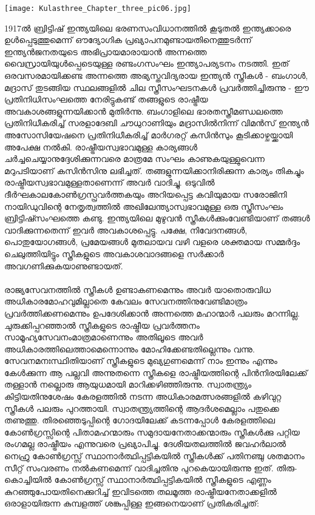 \label{ch3box2} %
\begin{tcolorbox}[%
 breakable, %
  arc=0mm, 
  left=1pt, right = 1pt, 
  boxrule=0mm,
  colback = {blue!10}, %
] 

\begin{center}
\texttt{[image: Kulasthree\_Chapter\_three\_pic06.jpg]}
\end{center}


1917ൽ ബ്രിട്ടിഷ് ഇന്ത്യയിലെ ഭരണസംവിധാനത്തിൽ കൂടുതൽ ഇന്ത്യക്കാരെ ഉൾപ്പെടുത്തുമെന്ന് ഔദ്യോഗിക പ്രഖ്യാപനമുണ്ടായതിനെത്തുടർന്ന് ഇന്ത്യൻജനതയുടെ അഭിപ്രായമാരായാൻ അന്നത്തെ വൈസ്രായിയുൾപ്പെടെയുള്ള രണ്ടംഗസംഘം ഇന്ത്യാപര്യടനം നടത്തി. ഇത് ഒരവസരമായിക്കണ്ട അന്നത്തെ അഭ്യസ്തവിദ്യരായ ഇന്ത്യൻ സ്ത്രീകൾ - ബംഗാൾ, മദ്രാസ് തുടങ്ങിയ സ്ഥലങ്ങളിൽ ചില സ്ത്രീസംഘടനകൾ പ്രവർത്തിച്ചിരുന്നു - ഈ പ്രതിനിധിസംഘത്തെ നേരിട്ടുകണ്ട് തങ്ങളുടെ രാഷ്ട്രീയ അവകാശങ്ങളുന്നയിക്കാൻ മുതിർന്നു. ബംഗാളിലെ ഭാരതസ്ത്രീമണ്ഡലത്തെ പ്രതിനിധീകരിച്ച് സരളാദേബി ചൗധുറാണിയും മദ്രാസിൽനിന്ന് വിമൻസ് ഇന്ത്യൻ അസോസിയേഷനെ പ്രതിനിധീകരിച്ച് മാർഗരറ്റ് കസിൻസും കൂടിക്കാഴ്ചയ്ക്കായി അപേക്ഷ നൽകി. രാഷ്ട്രീയസ്വഭാവമുള്ള കാര്യങ്ങൾ ചർച്ചചെയ്യാനുദ്ദേശിക്കുന്നവരെ മാത്രമേ സംഘം കാണുകയുള്ളുവെന്ന മറുപടിയാണ് കസിൻസിനു ലഭിച്ചത്. തങ്ങളുന്നയിക്കാനിരിക്കുന്ന കാര്യം തികച്ചും രാഷ്ട്രീയസ്വഭാവമുള്ളതാണെന്ന് അവർ വാദിച്ചു. ഒടുവിൽ ദീർഘകാലകോൺഗ്രസ്പ്രവർത്തകയും അറിയപ്പെട്ട കവിയുമായ സരോജിനി നായിഡുവിന്റെ നേതൃത്വത്തിൽ അഖിലേന്ത്യാസ്വഭാവമുള്ള ഒരു സ്ത്രീസംഘം ബ്രിട്ടിഷ്സംഘത്തെ കണ്ടു. ഇന്ത്യയിലെ മുഴുവൻ സ്ത്രീകൾക്കുംവേണ്ടിയാണ് തങ്ങൾ വാദിക്കുന്നതെന്ന് ഇവർ അവകാശപ്പെട്ടു. പക്ഷേ, നിവേദനങ്ങൾ, പൊതുയോഗങ്ങൾ, പ്രമേയങ്ങൾ മുതലായവ വഴി വളരെ ശക്തമായ സമ്മർദ്ദം ചെലുത്തിയിട്ടും സ്ത്രീകളുടെ അവകാശവാദങ്ങളെ സർക്കാർ അവഗണിക്കുകയാണുണ്ടായത്.

\end{tcolorbox}

\paragraph{}

രാജ്യസേവനത്തിൽ സ്ത്രീകൾ ഉണ്ടാകണമെന്നും അവർ യാതൊരുവിധ അധികാരമോഹവുമില്ലാതെ കേവലം സേവനത്തിനുവേണ്ടിമാത്രം പ്രവർത്തിക്കണമെന്നും ഉപദേശിക്കാൻ അന്നത്തെ മഹാന്മാർ പലരും മറന്നില്ല. ചുരുക്കിപ്പറഞ്ഞാൽ സ്ത്രീകളുടെ രാഷ്ട്രീയ പ്രവർത്തനം സാമൂഹ്യസേവനംമാത്രമാണെന്നും അതിലൂടെ അവർ അധികാരത്തിലെത്താമെന്നൊന്നും മോഹിക്കേണ്ടതില്ലെന്നും വന്നു. സേവനമനഃസ്ഥിതിയാണ് സ്ത്രീകളുടെ മുഖ്യഗുണമെന്ന് നാം ഇന്നും എന്നും കേൾക്കുന്ന ആ പല്ലവി അന്നുതന്നെ സ്ത്രീകളെ രാഷ്ട്രീയത്തിന്റെ പിൻനിരയിലേക്ക് തള്ളാൻ നല്ലൊരു ആയുധമായി മാറിക്കഴിഞ്ഞിരുന്നു. സ്വാതന്ത്ര്യം കിട്ടിയതിനുശേഷം കേരളത്തിൽ നടന്ന അധികാരമത്സരങ്ങളിൽ കഴിവുറ്റ സ്ത്രീകൾ പലരും പുറത്തായി. സ്വാതന്ത്ര്യത്തിന്റെ ആദർശമെല്ലാം പതുക്കെ തണുത്തു. തിരഞ്ഞെടുപ്പിന്റെ ഗോദയിലേക്ക് കടന്നപ്പോൾ കേരളത്തിലെ കോൺഗ്രസ്സിന്റെ പിതാമഹന്മാരും സമുദായനേതാക്കന്മാരും സ്ത്രീകൾക്കു പറ്റിയ രംഗമല്ല രാഷ്ട്രീയം എന്നുവരെ പ്രഖ്യാപിച്ചു. ദേശീയതലത്തിൽ ജവഹർലാൽ നെഹ്രു കോൺഗ്രസ്സ് സ്ഥാനാർത്ഥിപ്പട്ടികയിൽ സ്ത്രീകൾക്ക് പതിനഞ്ചു ശതമാനം സീറ്റ് സംവരണം നൽകണമെന്ന് വാദിച്ചതിനു പുറകെയായിരുന്നു ഇത്. തിരു-കൊച്ചിയിൽ കോൺഗ്രസ്സ് സ്ഥാനാർത്ഥിപ്പട്ടികയിൽ സ്ത്രീകളുടെ എണ്ണം കുറഞ്ഞുപോയതിനെക്കുറിച്ച് ഇവിടത്തെ തലമൂത്ത രാഷ്ട്രീയനേതാക്കളിൽ ഒരാളായിരുന്ന കുമ്പളത്ത് ശങ്കുപ്പിള്ള ഇങ്ങനെയാണ് പ്രതികരിച്ചത്:

